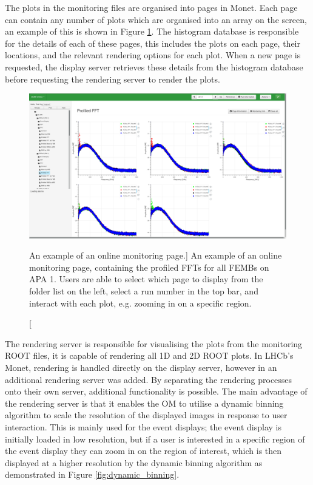 The plots in the monitoring files are organised into pages in Monet. Each page
can contain any number of plots which are organised into an array on the screen,
an example of this is shown in Figure \ref{fig:monet_page}. The histogram 
database is responsible for the details of each of these pages, this includes
the plots on each page, their locations, and the relevant rendering options for
each plot. When a new page is requested, the display server retrieves these
details from the histogram database before requesting the rendering server to 
render the plots.

\begin{figure}

	\centering

	\includegraphics[width=\textwidth]{figures/profiled_fft_monet.png}

	\caption
	[An example of an online monitoring page.] 
	{ An example of an online monitoring page, containing the profiled FFTs for
	all FEMBs on APA 1. Users are able to select which page to display from the
	folder list on the left, select a run number in the top bar, and interact 
	with each plot, e.g. zooming in on a specific region.} 
	\label{fig:monet_page}

\end{figure}

The rendering server is responsible for visualising the plots from the 
monitoring ROOT files, it is capable of rendering all 1D and 2D ROOT plots. In 
LHCb's Monet, rendering is handled directly on the display server, however in 
\protodune{} an additional rendering server was added. By separating the 
rendering processes onto their own server, additional functionality is 
possible. The main advantage of the rendering server is that it enables the 
OM to utilise a dynamic binning algorithm to scale the resolution of the 
displayed images in response to user interaction. This is mainly used for the 
event displays; the event display is initially loaded in low resolution, but 
if a user is interested in a specific region of the event display they can 
zoom in on the region of interest, which is then displayed at a higher 
resolution by the dynamic binning algorithm as demonstrated in Figure 
\ref{fig:dynamic_binning}.


